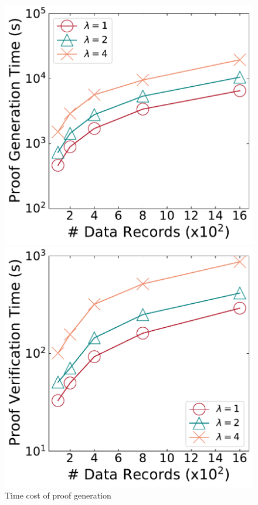 \documentclass[11pt,divpdfm]{article}
\begin{document}
\begin{figure}[t]
	\centering %
	\begin{minipage}[b]{0.4\textwidth} %
		\centering %
		\includegraphics[width=1\textwidth]{figs/Result_ProverTime.pdf} %
		\caption{Time cost of proof generation}
		\label{fig:ResultProverTime}
	\end{minipage}
	\begin{minipage}[b]{0.4\textwidth} %
		\centering %
		\includegraphics[width=1\textwidth]{figs/Result_VerifierTime.pdf} %

\end{minipage}
\end{figure}
\end{document}
